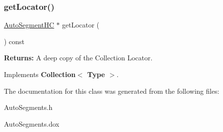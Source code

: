 \subsubsection{\texorpdfstring{get\+Locator()}{getLocator()}}
{\footnotesize\ttfamily \mbox{\hyperlink{namespaceKatabatic_acb3628dc7705fefe38a665cfe43efa6e}{Auto\+Segment\+HC}} $\ast$ get\+Locator (\begin{DoxyParamCaption}{ }\end{DoxyParamCaption}) const\hspace{0.3cm}{\ttfamily [virtual]}}

{\bfseries Returns\+:} A deep copy of the Collection Locator. 

Implements \textbf{ Collection$<$ Type $>$}.



The documentation for this class was generated from the following files\+:\begin{DoxyCompactItemize}
\item 
Auto\+Segments.\+h\item 
Auto\+Segments.\+dox\end{DoxyCompactItemize}
